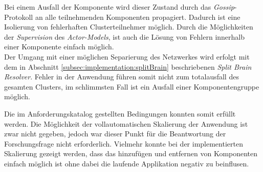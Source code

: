 \begin{enumerate}
    Bei einem Ausfall der Komponente wird dieser Zustand durch das \textit{Gossip}-Protokoll an alle teilnehmenden Komponenten propagiert. Dadurch ist eine Isolierung von fehlerhaften Clusterteilnehmer möglich. Durch die Möglichkeiten der \textit{Supervision} des \textit{Actor-Models}, ist auch die Lösung von Fehlern innerhalb einer Komponente einfach möglich. \\
    Der Umgang mit einer möglichen Separierung des Netzwerkes wird erfolgt mit dem in Abschnitt \ref{subsec:implementation:splitBrain} beschriebenen \textit{Split Brain Resolver}. Fehler in der Anwendung führen somit nicht zum totalausfall des gesamten Clusters, im schlimmsten Fall ist ein Ausfall einer Komponentengruppe möglich.
\end{enumerate}
Die im Anforderungskatalog gestellten Bedingungen konnten somit erfüllt werden. Die Möglichkeit der vollautomatischen Skalierung der Anwendung ist zwar nicht gegeben, jedoch war dieser Punkt für die Beantwortung der Forschungsfrage nicht erforderlich. Vielmehr konnte bei der implementierten Skalierung gezeigt werden, dass das hinzufügen und entfernen von Komponenten einfach möglich ist ohne dabei die laufende Applikation negativ zu beinflusen. 


